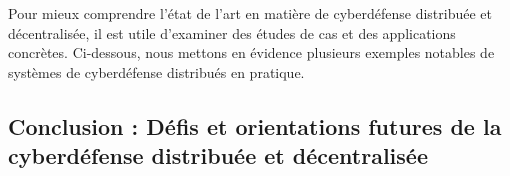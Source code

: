 
Pour mieux comprendre l'état de l'art en matière de cyberdéfense distribuée et décentralisée, il est utile d'examiner des études de cas et des applications concrètes. Ci-dessous, nous mettons en évidence plusieurs exemples notables de systèmes de cyberdéfense distribués en pratique.







\subsection{Conclusion : Défis et orientations futures de la cyberdéfense distribuée et décentralisée}

